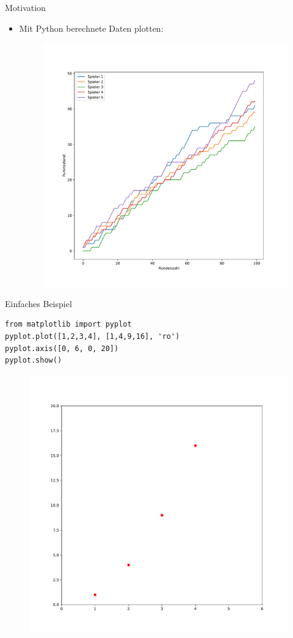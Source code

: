 \begin{frame}{Motivation}
    \begin{itemize}
        \item Mit Python berechnete Daten plotten:
        \begin{figure}[h]
            \includegraphics[width = .7\linewidth]{../images/spielplot}
        \end{figure}
    \end{itemize}
\end{frame}

\begin{frame}[fragile]{Einfaches Beispiel}
    \begin{lstlisting}
from matplotlib import pyplot
pyplot.plot([1,2,3,4], [1,4,9,16], 'ro')
pyplot.axis([0, 6, 0, 20])
pyplot.show()
    \end{lstlisting}

    \begin{figure}[h]
        \includegraphics[width=.5\linewidth]{../images/matplotlib_example1}
    \end{figure}
\end{frame}

